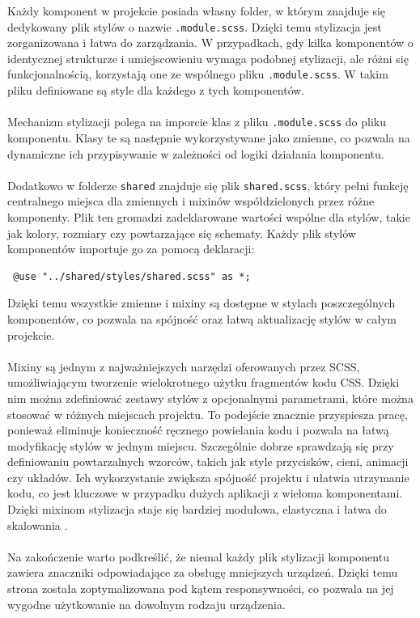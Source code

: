 \documentclass[twoside]{projektInzynierskiMS1}
\begin{document}
\noindent
Każdy komponent w projekcie posiada własny folder, w którym znajduje się dedykowany plik stylów o nazwie \texttt{.module.scss}. Dzięki temu stylizacja jest zorganizowana i łatwa do zarządzania. W przypadkach, gdy kilka komponentów o identycznej strukturze i umiejscowieniu wymaga podobnej stylizacji, ale różni się funkcjonalnością, korzystają one ze wspólnego pliku \texttt{.module.scss}. W takim pliku definiowane są style dla każdego z tych komponentów.
\\\\
Mechanizm stylizacji polega na imporcie klas z pliku \texttt{.module.scss} do pliku komponentu. Klasy te są następnie wykorzystywane jako zmienne, co pozwala na dynamiczne ich przypisywanie w zależności od logiki działania komponentu.
\\\\
Dodatkowo w folderze \texttt{shared} znajduje się plik \texttt{shared.scss}, który pełni funkcję centralnego miejsca dla zmiennych i mixinów współdzielonych przez różne komponenty. Plik ten gromadzi zadeklarowane wartości wspólne dla stylów, takie jak kolory, rozmiary czy powtarzające się schematy. Każdy plik stylów komponentów importuje go za pomocą deklaracji:

\begin{verbatim} @use "../shared/styles/shared.scss" as *; \end{verbatim}

\noindent
Dzięki temu wszystkie zmienne i mixiny są dostępne w stylach poszczególnych komponentów, co pozwala na spójność oraz łatwą aktualizację stylów w całym projekcie.
\\\\
Mixiny są jednym z najważniejszych narzędzi oferowanych przez SCSS, umożliwiającym tworzenie wielokrotnego użytku fragmentów kodu CSS. Dzięki nim można zdefiniować zestawy stylów z opcjonalnymi parametrami, które można stosować w różnych miejscach projektu. To podejście znacznie przyspiesza pracę, ponieważ eliminuje konieczność ręcznego powielania kodu i pozwala na łatwą modyfikację stylów w jednym miejscu. Szczególnie dobrze sprawdzają się przy definiowaniu powtarzalnych wzorców, takich jak style przycisków, cieni, animacji czy układów. Ich wykorzystanie zwiększa spójność projektu i ułatwia utrzymanie kodu, co jest kluczowe w przypadku dużych aplikacji z wieloma komponentami. Dzięki mixinom stylizacja staje się bardziej modułowa, elastyczna i łatwa do skalowania \cite{SassMixins}.
\\\\
Na zakończenie warto podkreślić, że niemal każdy plik stylizacji komponentu zawiera znaczniki odpowiadające za obsługę mniejszych urządzeń. Dzięki temu strona została zoptymalizowana pod kątem responsywności, co pozwala na jej wygodne użytkowanie na dowolnym rodzaju urządzenia.
\end{document}
